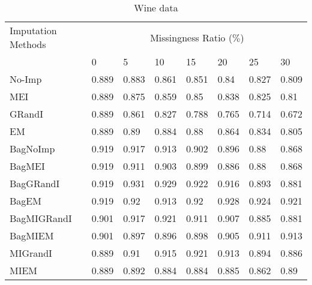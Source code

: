 \documentclass{iosart2c}
\begin{document}
\begin{table*}[htb]
\centering
\caption{Wine data}
\label{tab:wine}
    \begin{tabular}{|p{25mm}|l|l|l|l|l|l|l|} \hline
     Imputation Methods    & \multicolumn{7}{c|}{Missingness Ratio ($\%$)} \\ \cline{2-8}
                           &  0 & 5 & 10 & 15 & 20 & 25 & 30 \\ \hline
No-Imp & 0.889 & 0.883 & 0.861 & 0.851 & 0.84 & 0.827 & 0.809 \\ \hline
MEI & 0.889 & 0.875 & 0.859 & 0.85 & 0.838 & 0.825 & 0.81 \\ \hline
GRandI & 0.889 & 0.861 & 0.827 & 0.788 & 0.765 & 0.714 & 0.672 \\ \hline
EM & 0.889 & 0.89 & 0.884 & 0.88 & 0.864 & 0.834 & 0.805 \\ \hline \hline
BagNoImp & 0.919 & 0.917 & 0.913 & 0.902 & 0.896 & 0.88 & 0.868 \\ \hline
BagMEI & 0.919 & 0.911 & 0.903 & 0.899 & 0.886 & 0.88 & 0.868 \\ \hline
BagGRandI & 0.919 & 0.931 & 0.929 & 0.922 & 0.916 & 0.893 & 0.881 \\ \hline
BagEM & 0.919 & 0.92 & 0.913 & 0.92 & 0.928 & 0.924 & 0.921 \\ \hline \hline
BagMIGRandI & 0.901 & 0.917 & 0.921 & 0.911 & 0.907 & 0.885 & 0.881 \\ \hline
BagMIEM & 0.901 & 0.897 & 0.896 & 0.898 & 0.905 & 0.911 & 0.913 \\ \hline \hline
MIGrandI & 0.889 & 0.91 & 0.915 & 0.921 & 0.913 & 0.894 & 0.886 \\ \hline
MIEM & 0.889 & 0.892 & 0.884 & 0.884 & 0.885 & 0.862 & 0.89 \\ \hline
                         
\end{tabular}
\end{table*}
\end{document}

